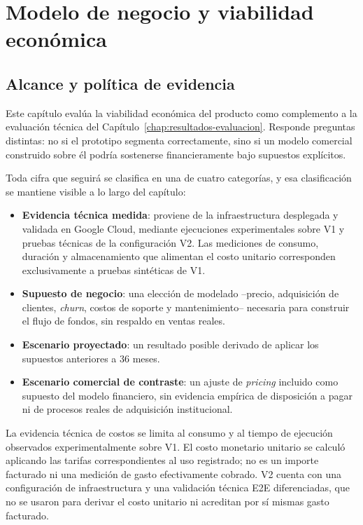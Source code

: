 \chapter{Modelo de negocio y viabilidad económica}
\label{chap:modelo-negocio}

\section{Alcance y política de evidencia}
\label{sec:mn-alcance}

Este capítulo evalúa la viabilidad económica del producto como complemento a la evaluación técnica del Capítulo~\ref{chap:resultados-evaluacion}. Responde preguntas distintas: no si el prototipo segmenta correctamente, sino si un modelo comercial construido sobre él podría sostenerse financieramente bajo supuestos explícitos.

Toda cifra que seguirá se clasifica en una de cuatro categorías, y esa clasificación se mantiene visible a lo largo del capítulo:

\begin{itemize}
    \item \textbf{Evidencia técnica medida}: proviene de la infraestructura desplegada y validada en Google Cloud, mediante ejecuciones experimentales sobre V1 y pruebas técnicas de la configuración V2. Las mediciones de consumo, duración y almacenamiento que alimentan el costo unitario corresponden exclusivamente a pruebas sintéticas de V1.
    \item \textbf{Supuesto de negocio}: una elección de modelado --precio, adquisición de clientes, \textit{churn}, costos de soporte y mantenimiento-- necesaria para construir el flujo de fondos, sin respaldo en ventas reales.
    \item \textbf{Escenario proyectado}: un resultado posible derivado de aplicar los supuestos anteriores a 36 meses.
    \item \textbf{Escenario comercial de contraste}: un ajuste de \textit{pricing} incluido como supuesto del modelo financiero, sin evidencia empírica de disposición a pagar ni de procesos reales de adquisición institucional.
\end{itemize}

La evidencia técnica de costos se limita al consumo y al tiempo de ejecución observados experimentalmente sobre V1. El costo monetario unitario se calculó aplicando las tarifas correspondientes al uso registrado; no es un importe facturado ni una medición de gasto efectivamente cobrado. V2 cuenta con una configuración de infraestructura y una validación técnica E2E diferenciadas, que no se usaron para derivar el costo unitario ni acreditan por sí mismas gasto facturado.

